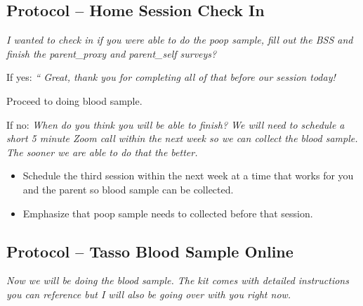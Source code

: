 \documentclass[]{book}
\begin{document}
\hypertarget{protocol-home-session-check-in}{%
\subsection{Protocol -- Home Session Check In}\label{protocol-home-session-check-in}}

\emph{I wanted to check in if you were able to do the poop sample, fill out the BSS and finish the parent\_proxy and parent\_self surveys?}

If yes: \emph{`` Great, thank you for completing all of that before our session today!}

Proceed to doing blood sample.

If no: \emph{When do you think you will be able to finish? We will need to schedule a short 5 minute Zoom call within the next week so we can collect the blood sample. The sooner we are able to do that the better.}

\begin{itemize}
\item
  Schedule the third session within the next week at a time that works for you and the parent so blood sample can be collected.
\item
  Emphasize that poop sample needs to collected before that session.
\end{itemize}

\hypertarget{protocol-tasso-blood-sample-online}{%
\subsection{Protocol -- Tasso Blood Sample Online}\label{protocol-tasso-blood-sample-online}}

\emph{Now we will be doing the blood sample. The kit comes with detailed instructions you can reference but I will also be going over with you right now. }
\end{document}
